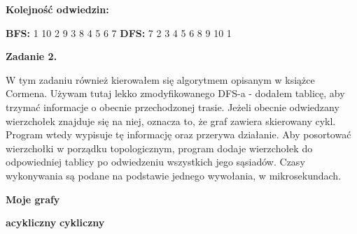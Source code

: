 \documentclass[15pt, a4paper]{article}
\begin{document}
\vspace{0.5cm} 

\begin{center}
    \textbf{Kolejność odwiedzin:}
\end{center}

\vspace{0.3cm} 

\noindent
\textbf{BFS:} 1 10 2 9 3 8 4 5 6 7  \hfill \textbf{DFS:} 7 2 3 4 5 6 8 9 10 1  

\vspace{1.5cm}


\vspace{0.5cm}

\noindent\hrulefill

\vspace{0.5cm}

\noindent\textbf{Zadanie 2.} 

\noindent W tym zadaniu również kierowałem się algorytmem opisanym w książce Cormena. Używam tutaj lekko zmodyfikowanego DFS-a - dodałem tablicę, aby trzymać informacje o obecnie przechodzonej trasie. Jeżeli obecnie odwiedzany wierzchołek znajduje się na niej, oznacza to, że graf zawiera skierowany cykl. Program wtedy wypisuje tę informację oraz przerywa działanie. Aby posortować wierzchołki w porządku topologicznym, program dodaje wierzchołek do odpowiedniej tablicy po odwiedzeniu wszystkich jego sąsiadów. Czasy wykonywania są podane na podstawie jednego wywołania, w mikrosekundach.

\vspace{0.5cm}

\begin{center}
    \textbf{Moje grafy}
\end{center}

\begin{center}
    \textbf{acykliczny} \hspace{4cm} \textbf{cykliczny}
\end{center}
\end{document}

